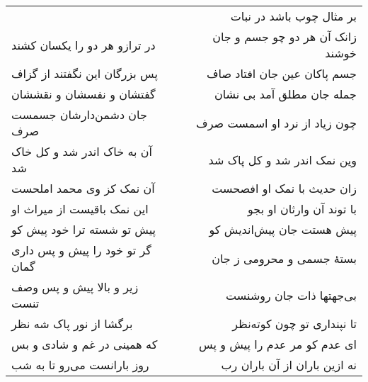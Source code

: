 \begin{center}
\begin{longtable}{l p{0.5cm} r}
&&
بر مثال چوب باشد در نبات
\\
در ترازو هر دو را یکسان کشند
&&
زانک آن هر دو چو جسم و جان خوشند
\\
پس بزرگان این نگفتند از گزاف
&&
جسم پاکان عین جان افتاد صاف
\\
گفتشان و نفسشان و نقششان
&&
جمله جان مطلق آمد بی نشان
\\
جان دشمن‌دارشان جسمست صرف
&&
چون زیاد از نرد او اسمست صرف
\\
آن به خاک اندر شد و کل خاک شد
&&
وین نمک اندر شد و کل پاک شد
\\
آن نمک کز وی محمد املحست
&&
زان حدیث با نمک او افصحست
\\
این نمک باقیست از میراث او
&&
با توند آن وارثان او بجو
\\
پیش تو شسته ترا خود پیش کو
&&
پیش هستت جان پیش‌اندیش کو
\\
گر تو خود را پیش و پس داری گمان
&&
بستهٔ جسمی و محرومی ز جان
\\
زیر و بالا پیش و پس وصف تنست
&&
بی‌جهتها ذات جان روشنست
\\
برگشا از نور پاک شه نظر
&&
تا نپنداری تو چون کوته‌نظر
\\
که همینی در غم و شادی و بس
&&
ای عدم کو مر عدم را پیش و پس
\\
روز بارانست می‌رو تا به شب
&&
نه ازین باران از آن باران رب
\\
\end{longtable}
\end{center}
